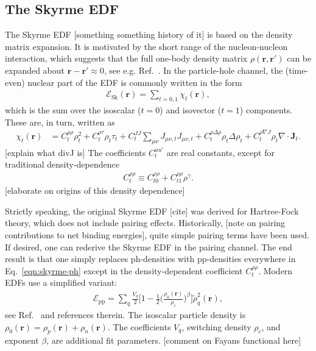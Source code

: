 \documentclass[../thesis.tex]{subfiles}
\begin{document}
\subsection{The Skyrme EDF}
The Skyrme EDF [something something history of it] is based on the density matrix expansion. It is motivated by the short range of the nucleon-nucleon interaction, which suggests that the full one-body density matrix $\rho(\bm{r},\bm{r}')$ can be expanded about $\bm{r}-\bm{r}'\approx0$, see e.g. Ref.~\cite{Bender2003}. In the particle-hole channel, the (time-even) nuclear part of the EDF is commonly written in the form~\cite{Kortelainen2014}
\begin{align}
	\mathcal{E}_\textrm{Sk}(\bm{r})=\sum_{t=0,1}\chi_t(\bm{r}),
\end{align}
which is the sum over the isoscalar ($t=0$) and isovector ($t=1$) components. These are, in turn, written as
\begin{align}\label{eqn:skyrme-ph}
	\chi_t(\bm{r})&=C_t^{\rho\rho}\rho_t^2+C_t^{\rho\tau}\rho_t\tau_t+C_t^{JJ}\sum_{\mu\nu}J_{\mu\nu,t}J_{\mu\nu,t}+C_t^{\rho\Delta\rho}\rho_t\Delta\rho_t+C_t^{\rho\nabla J}\rho_t\nabla\cdot\bm{J}_t.
\end{align}
[explain what divJ is] The coefficients $C_t^{uu'}$ are real constants, except for traditional density-dependence
\begin{align}
	C_t^{\rho\rho}\equiv C_{t0}^{\rho\rho}+C_{t1}^{\rho\rho}\rho^\gamma.
\end{align}
[elaborate on origins of this density dependence]

Strictly speaking, the original Skyrme EDF [cite] was derived for Hartree-Fock theory, which does not include pairing effects. Historically, [note on pairing contributions to net binding energies], quite simple pairing terms have been used. If desired, one can rederive the Skyrme EDF in the pairing channel. The end result is that one simply replaces ph-densities with pp-densities everywhere in Eq.~\ref{eqn:skyrme-ph} except in the density-dependent coefficient $C_t^{\rho\rho}$. Modern EDFs use a simplified variant:
\begin{align}
	\mathcal{E}_\textrm{pp}=\sum_q\frac{V_q}{2}\bigg[1-\frac{1}{2}\bigg(\frac{\rho_0(\bm{r})}{\rho_c}\bigg)^\beta\bigg]\tilde{\rho}_q^2(\bm{r}),
\end{align}
see Ref.~\cite{Bender2003} and references therein. The isoscalar particle density is $\rho_0(\bm{r})=\rho_p(\bm{r})+\rho_n(\bm{r})$. The coefficients $V_q$, switching density $\rho_c$, and exponent $\beta$, are additional fit parameters. [comment on Fayans functional here]
\end{document}
